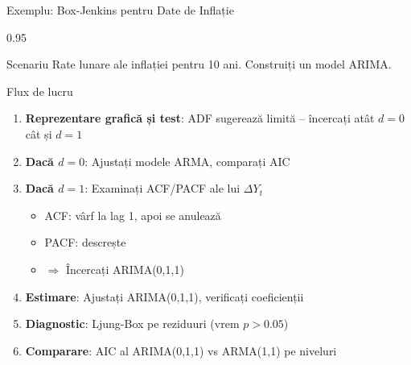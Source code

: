 \documentclass[9pt, aspectratio=169, t]{beamer}
\begin{document}
\begin{frame}{Exemplu: Box-Jenkins pentru Date de Inflație}
    \begin{cminipage}{0.95\textwidth}
    \begin{block}{Scenariu}
        Rate lunare ale inflației pentru 10 ani. Construiți un model ARIMA.
    \end{block}

    \begin{exampleblock}{Flux de lucru}
        \begin{enumerate}\setlength{\itemsep}{0pt}
            \item \textbf{Reprezentare grafică și test}: ADF sugerează limită -- încercați atât $d=0$ cât și $d=1$
            \item \textbf{Dacă $d=0$}: Ajustați modele ARMA, comparați AIC
            \item \textbf{Dacă $d=1$}: Examinați ACF/PACF ale lui $\Delta Y_t$
                \begin{itemize}\setlength{\itemsep}{0pt}
                    \item ACF: vârf la lag 1, apoi se anulează
                    \item PACF: descrește
                    \item $\Rightarrow$ Încercați ARIMA(0,1,1)
                \end{itemize}
            \item \textbf{Estimare}: Ajustați ARIMA(0,1,1), verificați coeficienții
            \item \textbf{Diagnostic}: Ljung-Box pe reziduuri (vrem $p > 0.05$)
            \item \textbf{Comparare}: AIC al ARIMA(0,1,1) vs ARMA(1,1) pe niveluri
        \end{enumerate}
    \end{exampleblock}
    \end{cminipage}
\end{frame}
\end{document}
